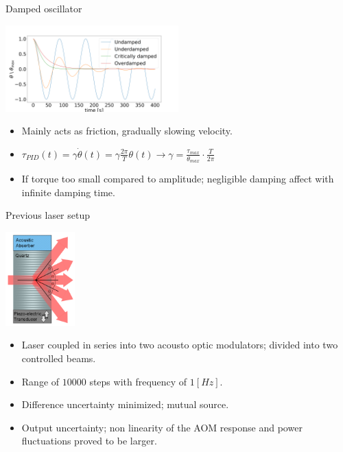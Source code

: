 \documentclass{beamer}
\begin{document}
\begin{frame}{Damped oscillator}
	\begin{center}		
		\includegraphics[width=0.5\textwidth,keepaspectratio]{damp.png}
	\end{center}
	\begin{itemize}		
		
		\item Mainly acts as friction, gradually slowing velocity.
		\item $\tau_{PID}(t) =  \gamma\dot{\theta}(t) =  \gamma\frac{2\pi}{T} \theta( t) \rightarrow \gamma  =\frac{\tau_{max}}{\theta_{max}}\cdot \frac{ T}{2\pi} $
		\item If torque too small compared to amplitude; negligible damping affect with infinite damping time. 
		
	\end{itemize}
\end{frame}


\begin{frame}{Previous laser setup}
	\begin{center}		
		\includegraphics[width=0.2\textwidth,keepaspectratio]{aom.png}
	\end{center}
	\begin{itemize}		
		\item Laser coupled in series into two acousto optic modulators; divided into two controlled beams.
		\item Range of $10000$ steps with frequency of $1 [Hz]$.
		\item Difference uncertainty minimized; mutual source.
		\item Output uncertainty; non linearity of the AOM response and power fluctuations proved to be larger.
	\end{itemize}
\end{frame}
\end{document}
